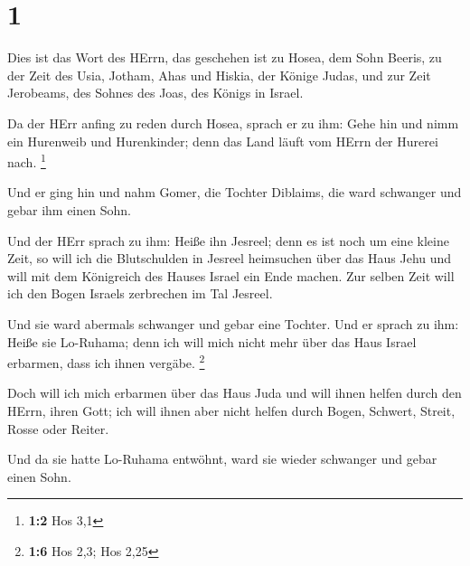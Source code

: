 \hypertarget{section}{%
\section{1}\label{section}}

 Dies ist das Wort des HErrn, das geschehen ist zu Hosea,
dem Sohn Beeris, zu der Zeit des Usia, Jotham, Ahas und Hiskia, der
Könige Judas, und zur Zeit Jerobeams, des Sohnes des Joas, des Königs in
Israel.

 Da der HErr anfing zu reden durch Hosea, sprach er zu ihm:
Gehe hin und nimm ein Hurenweib und Hurenkinder; denn das Land läuft vom
HErrn der Hurerei nach. \footnote{\textbf{1:2} Hos 3,1}

 Und er ging hin und nahm Gomer, die Tochter Diblaims, die
ward schwanger und gebar ihm einen Sohn.

 Und der HErr sprach zu ihm: Heiße ihn Jesreel; denn es ist
noch um eine kleine Zeit, so will ich die Blutschulden in Jesreel
heimsuchen über das Haus Jehu und will mit dem Königreich des Hauses
Israel ein Ende machen.  Zur selben Zeit will ich den Bogen
Israels zerbrechen im Tal Jesreel.

 Und sie ward abermals schwanger und gebar eine Tochter. Und
er sprach zu ihm: Heiße sie Lo-Ruhama; denn ich will mich nicht mehr
über das Haus Israel erbarmen, dass ich ihnen vergäbe. \footnote{\textbf{1:6}
  Hos 2,3; Hos 2,25}

 Doch will ich mich erbarmen über das Haus Juda und will
ihnen helfen durch den HErrn, ihren Gott; ich will ihnen aber nicht
helfen durch Bogen, Schwert, Streit, Rosse oder Reiter.

 Und da sie hatte Lo-Ruhama entwöhnt, ward sie wieder
schwanger und gebar einen Sohn.

